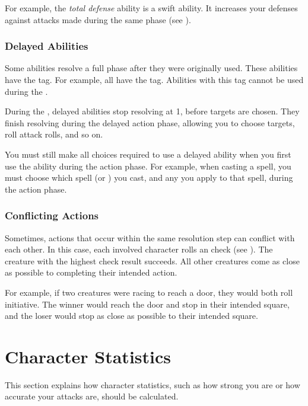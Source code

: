             For example, the \textit{total defense} ability is a swift ability.
            It increases your defenses against attacks made during the same phase (see ).

        \subsubsection{Delayed Abilities}\label{Delayed Abilities}
            Some abilities resolve a full phase after they were originally used.
            These abilities have the  tag.
            For example, all  have the  tag.
            Abilities with this tag cannot be used during the .

            During the , delayed abilities stop resolving at  1, before targets are chosen.
            They finish resolving during the delayed action phase, allowing you to choose targets, roll attack rolls, and so on.

            You must still make all choices required to use a delayed ability when you first use the ability during the action phase.
            For example, when casting a spell, you must choose which spell (or ) you cast, and any  you apply to that spell, during the action phase.

        \subsubsection{Conflicting Actions}\label{Conflicting Actions}

            Sometimes, actions that occur within the same resolution step can conflict with each other.
            In this case, each involved character rolls an  check (see ).
            The creature with the highest check result succeeds.
            All other creatures come as close as possible to completing their intended action.

            For example, if two creatures were racing to reach a door, they would both roll initiative.
            The winner would reach the door and stop in their intended square, and the loser would stop as close as possible to their intended square.

\section{Character Statistics}
    This section explains how character statistics, such as how strong you are or how accurate your attacks are, should be calculated.

